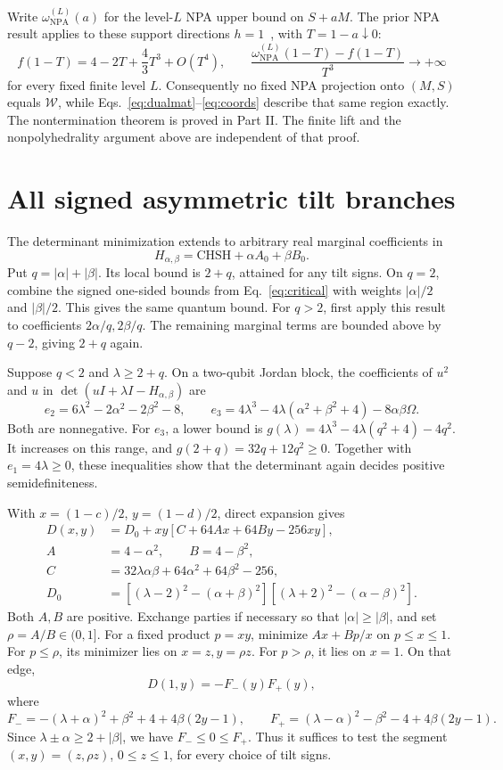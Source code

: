 \documentclass[11pt]{article}
\theoremstyle{remark}\newtheorem{remark}[theorem]{Remark}
\newcommand{\W}{\mathcal W}\newcommand{\sxdeg}{\operatorname{sxdeg}}
\begin{document}
Write $\omega_{\mathrm{NPA}}^{(L)}(a)$ for the level-$L$ NPA upper bound on
$S+aM$. The prior NPA result applies to these support directions
\(h=1\)~\cite{prior}, with $T=1-a\downarrow0$:
\[
 f(1-T)=4-2T+\frac43T^3+O(T^4),\qquad
 \frac{\omega_{\mathrm{NPA}}^{(L)}(1-T)-f(1-T)}{T^3}\longrightarrow+\infty
\]
for every fixed finite level \(L\).
Consequently no fixed NPA projection onto \((M,S)\) equals \(\W\), while
Eqs.~\eqref{eq:dualmat}--\eqref{eq:coords} describe that same region exactly.
The nontermination theorem is proved in Part II. The finite lift and the
nonpolyhedrality argument above are independent of that proof.

\section{All signed asymmetric tilt branches}

The determinant minimization extends to arbitrary real marginal coefficients in
\[
 H_{\alpha,\beta}=\mathrm{CHSH}+\alpha A_0+\beta B_0.
\]
Put \(q=|\alpha|+|\beta|\). Its local bound is \(2+q\), attained for any tilt
signs. On $q=2$, combine the signed one-sided bounds from
Eq.~\eqref{eq:critical} with weights $|\alpha|/2$ and $|\beta|/2$.
This gives the same quantum bound. For $q>2$, first apply this result
to coefficients $2\alpha/q,2\beta/q$. The remaining marginal terms
are bounded above by $q-2$, giving $2+q$ again.

Suppose \(q<2\) and \(\lambda\ge2+q\). On a two-qubit Jordan block,
the coefficients of $u^2$ and $u$ in
$\det(uI+\lambda I-H_{\alpha,\beta})$ are
\[
 e_2=6\lambda^2-2\alpha^2-2\beta^2-8,\qquad
 e_3=4\lambda^3-4\lambda(\alpha^2+\beta^2+4)-8\alpha\beta\Omega .
\]
Both are nonnegative. For \(e_3\), a lower bound is
\(g(\lambda)=4\lambda^3-4\lambda(q^2+4)-4q^2\).
It increases on this range, and \(g(2+q)=32q+12q^2\ge0\).
Together with $e_1=4\lambda\ge0$, these inequalities show that the
determinant again decides positive semidefiniteness.

With \(x=(1-c)/2\), \(y=(1-d)/2\), direct expansion gives
\begin{align*}
 D(x,y)&=D_0+xy[C+64Ax+64By-256xy],\\
 A&=4-\alpha^2,\qquad B=4-\beta^2,\\
 C&=32\lambda\alpha\beta+64\alpha^2+64\beta^2-256,\\
 D_0&=[(\lambda-2)^2-(\alpha+\beta)^2]
       [(\lambda+2)^2-(\alpha-\beta)^2].
\end{align*}
Both \(A,B\) are positive. Exchange parties if necessary so that
\(|\alpha|\ge|\beta|\), and set \(\rho=A/B\in(0,1]\).
For a fixed product \(p=xy\), minimize \(Ax+Bp/x\) on \(p\le x\le1\).
For \(p\le\rho\), its minimizer lies on \(x=z,y=\rho z\).
For \(p>\rho\), it lies on \(x=1\). On that edge,
\[
 D(1,y)=-F_-(y)F_+(y),
\]
where
\[
 F_-=-(\lambda+\alpha)^2+\beta^2+4+4\beta(2y-1),\qquad
 F_+=(\lambda-\alpha)^2-\beta^2-4+4\beta(2y-1).
\]
Since \(\lambda\pm\alpha\ge2+|\beta|\), we have \(F_-\le0\le F_+\).
Thus it suffices to test the segment $(x,y)=(z,\rho z)$,
$0\le z\le1$, for every choice of tilt signs.
\end{document}
